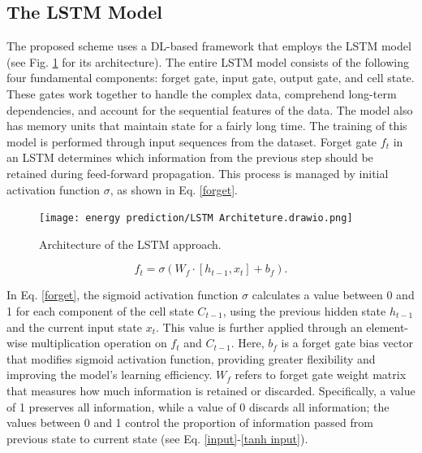 \documentclass[journal]{IEEEtran}
\begin{document}
\subsection{The LSTM Model}
The proposed scheme uses a DL-based framework that employs the LSTM model (see Fig. \ref{LSTM} for its architecture). The entire LSTM model consists of the following four fundamental components: forget gate, input gate, output gate, and cell state. These gates work together to handle the complex data, comprehend long-term dependencies, and account for the sequential features of the data. The model also has memory units that maintain state for a fairly long time. The training of this model is performed through input sequences from the dataset. Forget gate $f_t$ in an LSTM determines which information from the previous step should be retained during feed-forward propagation. This process is managed by initial activation function $\sigma$, as shown in Eq. \eqref{forget}.



\begin{figure}[!h]
    \centering
    \texttt{[image: energy prediction/LSTM Architeture.drawio.png]}
        \caption{Architecture of the LSTM approach.}
    \label{LSTM}
\end{figure}



 

\begin{equation}\label{forget}
f_t = \sigma \left( W_f \cdot [h_{t-1}, x_t] + b_f \right).
\end{equation}


In Eq. \eqref{forget}, the sigmoid activation function $\sigma$ calculates a value between 0 and 1 for each component of the cell state $C_{t-1}$, using the previous hidden state $h_{t-1}$ and the current input state $x_t$. This value is further applied through an element-wise multiplication operation on $f_t$ and $C_{t-1}$. Here, $b_f$ is a forget gate bias vector that modifies sigmoid activation function, providing greater flexibility and improving the model's learning efficiency. $W_f$ refers to forget gate weight matrix that measures how much information is retained or discarded. Specifically, a value of 1 preserves all information, while a value of 0 discards all information; the values between 0 and 1 control the proportion of information passed from previous state to current state (see Eq. \eqref{input}-\eqref{tanh input}).
\end{document}
